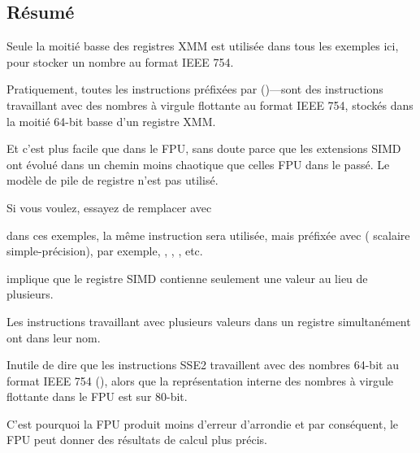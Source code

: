 

\subsection{Résumé}

Seule la moitié basse des registres XMM est utilisée dans tous les exemples ici,
pour stocker un nombre au format IEEE 754.

Pratiquement, toutes les instructions préfixées par  ()---sont
des instructions travaillant avec des nombres à virgule flottante au format IEEE
754, stockés dans la moitié 64-bit basse d'un registre XMM.

Et c'est plus facile que dans le FPU, sans doute parce que les extensions SIMD ont
évolué dans un chemin moins chaotique que celles FPU dans le passé.
Le modèle de pile de registre n'est pas utilisé.

Si vous voulez, essayez de remplacer \Tdouble avec \Tfloat

dans ces exemples, la même instruction sera utilisée, mais préfixée avec 
( scalaire simple-précision), par exemple, ,
, , etc.

implique que le registre SIMD contienne seulement une valeur au lieu de plusieurs.

Les instructions travaillant avec plusieurs valeurs dans un registre simultanément
ont  dans leur nom.

Inutile de dire que les instructions SSE2 travaillent avec des nombres 64-bit au
format IEEE 754 (\Tdouble), alors que la représentation interne des nombres à virgule
flottante dans le FPU est sur 80-bit.

C'est pourquoi la FPU produit moins d'erreur d'arrondie et par conséquent, le FPU
peut donner des résultats de calcul plus précis.
